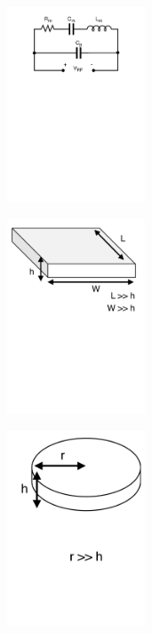 \begin{figure}
  \centering
  \begin{subfigure}[][][t]{0.3\textwidth}
      \includegraphics[width=0.45\textwidth]{Chapters/Figures/Ch2_UltrasoundFundamentals/bvd_model.pdf}
      \label{fig:ch2_bvd_model}
  \end{subfigure}
  \begin{subfigure}[][][t]{0.3\textwidth}
      \includegraphics[width=0.45\textwidth]{Chapters/Figures/Ch2_UltrasoundFundamentals/planar_piezo.pdf}
      \label{fig:ch2_planar}
  \end{subfigure}
  \begin{subfigure}[][][b]{0.3\textwidth}
      \includegraphics[width=0.45\textwidth]{Chapters/Figures/Ch2_UltrasoundFundamentals/cilinder_piezo.pdf}

\end{subfigure}
\end{figure}
